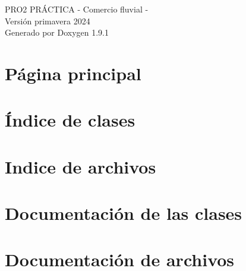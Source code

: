 \let\mypdfximage\pdfximage\def\pdfximage{\immediate\mypdfximage}\documentclass[twoside]{book}
\newcommand{\+}{\discretionary{\mbox{\scriptsize$\hookleftarrow$}}{}{}}
\newcommand{\clearemptydoublepage}{%
  \newpage{\pagestyle{empty}\cleardoublepage}%
}
\begin{document}
\raggedbottom

\hypersetup{pageanchor=false,
             bookmarksnumbered=true,
             pdfencoding=unicode
            }
\begin{titlepage}
\vspace*{7cm}
\begin{center}%
{\Large PRO2 PRÁ\+CTICA -\/ Comercio fluvial -\/ \\[1ex]\large Versión primavera 2024 }\\
\vspace*{1cm}
{\large Generado por Doxygen 1.9.1}\\
\end{center}
\end{titlepage}
\clearemptydoublepage
{}
\tableofcontents
\clearemptydoublepage
{}
\hypersetup{pageanchor=true}

\chapter{Página principal}
\label{index}\hypertarget{index}{}
\chapter{Índice de clases}

\chapter{Indice de archivos}

\chapter{Documentación de las clases}




\chapter{Documentación de archivos}











\backmatter
\newpage
{}
\clearemptydoublepage
{}
\printindex
\end{document}
